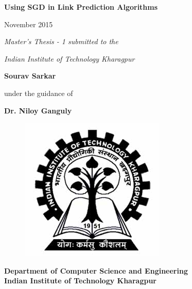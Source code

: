 \begin{titlepage}
{\centering \huge { \textbf{
     Using SGD in Link Prediction Algorithms}} \par 
}

\thispagestyle{empty}
\vspace{1cm}
\begin{center}
{
   
   November 2015
}
\end{center}
\vspace{1cm}
{\centering \large {\textit{ 
     Master's Thesis - 1 submitted to the } }  \par 
}
 
\vspace{0.5cm}
{\centering \large {\textit{ 
     Indian Institute of Technology 
     Kharagpur } }  \par 
}
 
% 

\vspace{0.875cm}
{\par}
\vspace{0.875cm}
{\centering \large \textbf{Sourav Sarkar}\par}
\vspace{0.75cm}
{\centering \large under the guidance of\par}
\vspace{0.75cm}
{\centering \large \textbf{Dr. Niloy Ganguly}\par}
\vspace{1cm}
\begin{figure}[h]
    \centering
    \includegraphics[scale=0.2]{cover_page/images/logo.jpg}
\end{figure}
\begin{center}
{
   \large \textbf{Department of Computer Science and Engineering} \\
   \large \textbf{Indian Institute of Technology Kharagpur}
   
}
\end{center}
\end{titlepage}